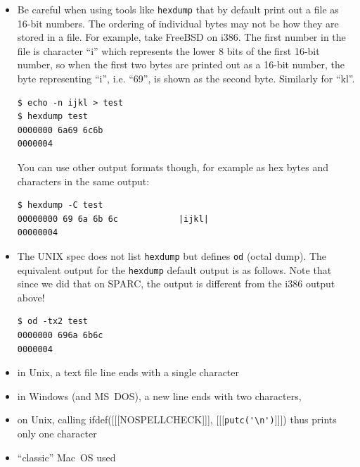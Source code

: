 \begin{itemize}
\item Be careful when using tools like \texttt{hexdump} that by default print
out a file as 16-bit numbers.  The ordering of individual bytes may not be how
they are stored in a file.  For example, take FreeBSD on i386.  The first number
in the file is character ``i'' which represents the lower 8 bits of the first 16-bit
number, so when the first two bytes are printed out as a 16-bit number, the byte
representing ``i'', i.e. ``69'', is shown as the second byte.  Similarly for
``kl''.

\begin{verbatim}
$ echo -n ijkl > test
$ hexdump test
0000000 6a69 6c6b
0000004
\end{verbatim}

You can use other output formats though, for example as hex bytes and
characters in the same output:

\begin{verbatim}
$ hexdump -C test
00000000 69 6a 6b 6c            |ijkl|
00000004
\end{verbatim}

\item The UNIX spec does not list \texttt{hexdump} but defines \texttt{od}
(octal dump).  The equivalent output for the \texttt{hexdump} default output is
as follows.  Note that since we did that on SPARC, the output is different from
the i386 output above!

\begin{verbatim}
$ od -tx2 test
0000000 696a 6b6c
0000004
\end{verbatim}
\end{itemize}


\begin{slide}
\begin{itemize}
\item in Unix, a text file line ends with a single character 
\item in Windows (and MS~DOS), a new line ends with two characters, 
\item on Unix, calling ifdef([[[NOSPELLCHECK]]], [[[\verb.putc('\n').]]])
thus prints only one character
\item ``classic'' Mac~OS used 
\end{itemize}
\end{slide}

